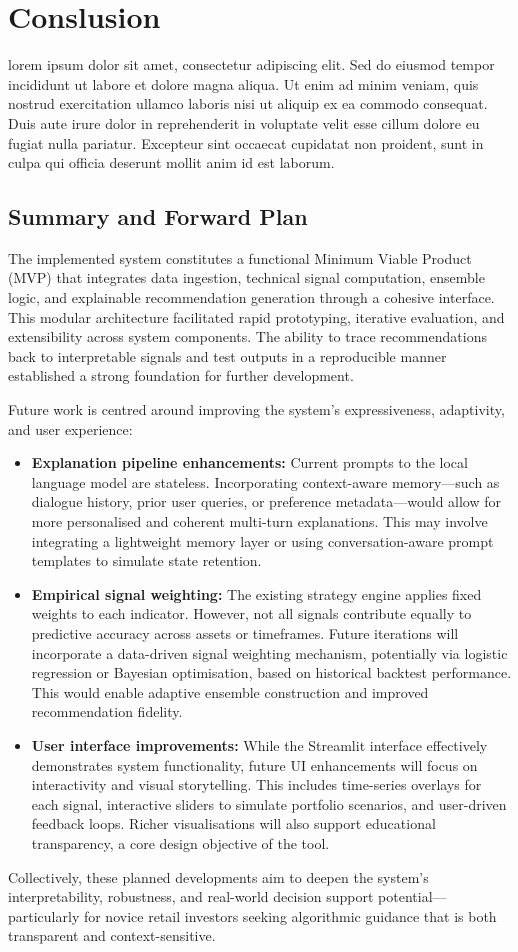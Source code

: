 \section{Conslusion}
lorem ipsum dolor sit amet, consectetur adipiscing elit. Sed do eiusmod tempor incididunt ut labore et dolore magna aliqua. Ut enim ad minim veniam, quis nostrud exercitation ullamco laboris nisi ut aliquip ex ea commodo consequat. Duis aute irure dolor in reprehenderit in voluptate velit esse cillum dolore eu fugiat nulla pariatur. Excepteur sint occaecat cupidatat non proident, sunt in culpa qui officia deserunt mollit anim id est laborum.

\subsection{Summary and Forward Plan}

The implemented system constitutes a functional Minimum Viable Product (MVP) that integrates data ingestion, technical signal computation, ensemble logic, and explainable recommendation generation through a cohesive interface. This modular architecture facilitated rapid prototyping, iterative evaluation, and extensibility across system components. The ability to trace recommendations back to interpretable signals and test outputs in a reproducible manner established a strong foundation for further development.

Future work is centred around improving the system’s expressiveness, adaptivity, and user experience:

\begin{itemize}
\item \textbf{Explanation pipeline enhancements:} Current prompts to the local language model are stateless. Incorporating context-aware memory—such as dialogue history, prior user queries, or preference metadata—would allow for more personalised and coherent multi-turn explanations. This may involve integrating a lightweight memory layer or using conversation-aware prompt templates to simulate state retention.
\item \textbf{Empirical signal weighting:} The existing strategy engine applies fixed weights to each indicator. However, not all signals contribute equally to predictive accuracy across assets or timeframes. Future iterations will incorporate a data-driven signal weighting mechanism, potentially via logistic regression or Bayesian optimisation, based on historical backtest performance. This would enable adaptive ensemble construction and improved recommendation fidelity.

\item \textbf{User interface improvements:} While the Streamlit interface effectively demonstrates system functionality, future UI enhancements will focus on interactivity and visual storytelling. This includes time-series overlays for each signal, interactive sliders to simulate portfolio scenarios, and user-driven feedback loops. Richer visualisations will also support educational transparency, a core design objective of the tool.
\end{itemize}

Collectively, these planned developments aim to deepen the system’s interpretability, robustness, and real-world decision support potential—particularly for novice retail investors seeking algorithmic guidance that is both transparent and context-sensitive.